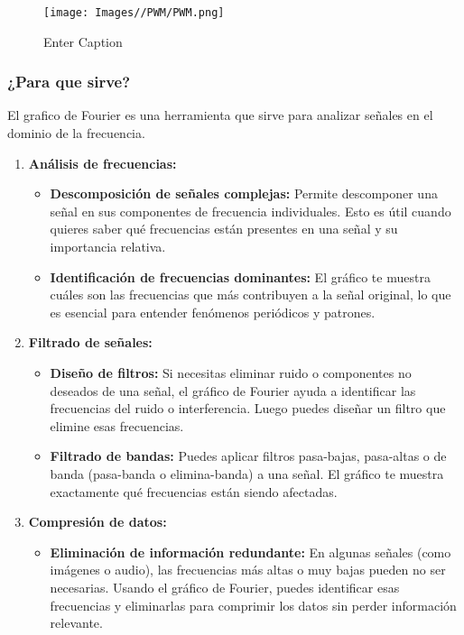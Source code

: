 \documentclass{article}
\begin{document}
\begin{figure}[H]
    \centering
    \texttt{[image: Images//PWM/PWM.png]}
    \caption{Enter Caption}
    \label{fig:enter-label}
\end{figure}

\subsubsection{¿Para que sirve?}
El grafico de Fourier es una herramienta que sirve para analizar señales en el dominio de la frecuencia.
\begin{enumerate}
    \item \textbf{Análisis de frecuencias:}
    \begin{itemize}
        \item \textbf{Descomposición de señales complejas:} Permite descomponer una señal en sus componentes de frecuencia individuales. Esto es útil cuando quieres saber qué frecuencias están presentes en una señal y su importancia relativa.
    
        \item \textbf{Identificación de frecuencias dominantes:} El gráfico te muestra cuáles son las frecuencias que más contribuyen a la señal original, lo que es esencial para entender fenómenos periódicos y patrones.
    \end{itemize}
    \item \textbf{Filtrado de señales:}
    \begin{itemize}
        \item \textbf{Diseño de filtros:} Si necesitas eliminar ruido o componentes no deseados de una señal, el gráfico de Fourier ayuda a identificar las frecuencias del ruido o interferencia. Luego puedes diseñar un filtro que elimine esas frecuencias.
    
        \item \textbf{Filtrado de bandas:} Puedes aplicar filtros pasa-bajas, pasa-altas o de banda (pasa-banda o elimina-banda) a una señal. El gráfico te muestra exactamente qué frecuencias están siendo afectadas.
    \end{itemize}
    
    \item \textbf{Compresión de datos:}
    \begin{itemize}
        \item \textbf{ Eliminación de información redundante:} En algunas señales (como imágenes o audio), las frecuencias más altas o muy bajas pueden no ser necesarias. Usando el gráfico de Fourier, puedes identificar esas frecuencias y eliminarlas para comprimir los datos sin perder información relevante.
    

\end{itemize}
\end{enumerate}
\end{document}
